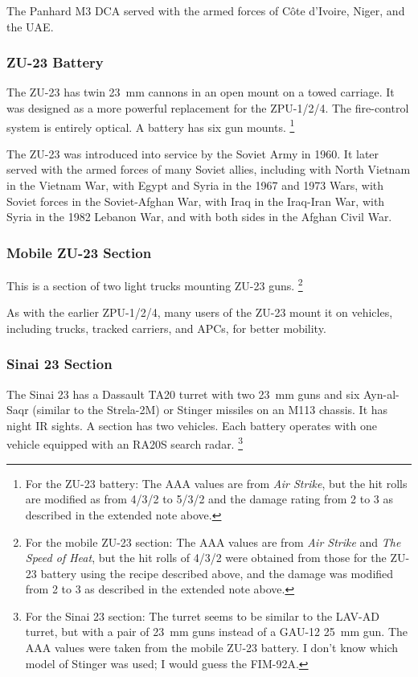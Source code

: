 \documentclass[10pt]{article}
\newcommand{\note}[1]{%
    \footnote{%
        \setlength{\parindent}{0pt}%
        \setlength{\parskip}{\smallskipamount}%
        #1
    }%
}
\begin{document}
The Panhard M3 DCA served with the armed forces of Côte d'Ivoire, Niger, and the UAE.

\subsubsection{ZU-23 Battery}

The ZU-23 has twin 23~mm cannons in an open mount on a towed carriage. It was designed as a more powerful replacement for the ZPU-1/2/4. The fire-control system is entirely optical. A battery has six gun mounts.%
\note{
    For the ZU-23 battery: The AAA values are from \emph{Air Strike}, but the hit rolls are modified as from 4/3/2 to 5/3/2 and the damage rating from 2 to 3 as described in the extended note above.
}

The ZU-23 was introduced into service by the Soviet Army in 1960. It later served with the armed forces of many Soviet allies, including with North Vietnam in the Vietnam War, with Egypt and Syria in the 1967 and 1973 Wars, with Soviet forces in the Soviet-Afghan War, with Iraq in the Iraq-Iran War, with Syria in the 1982 Lebanon War, and with both sides in the Afghan Civil War.

\subsubsection{Mobile ZU-23 Section}

This is a section of two light trucks mounting ZU-23 guns.%
\note{
    For the mobile ZU-23 section: The AAA values are from \emph{Air Strike} and \emph{The Speed of Heat}, but the hit rolls of 4/3/2 were obtained from those for the ZU-23 battery using the recipe described above, and the damage was modified from 2 to 3 as described in the extended note above.
}

As with the earlier ZPU-1/2/4, many users of the ZU-23 mount it on vehicles, including trucks, tracked carriers, and APCs, for better mobility.

\subsubsection{Sinai 23 Section}

The Sinai 23 has a Dassault TA20 turret with two 23~mm guns and six Ayn-al-Saqr (similar to the Strela-2M) or Stinger missiles on an M113 chassis. It has night IR sights. A section has two vehicles. Each battery operates with one vehicle equipped with an RA20S search radar.%
\note{
    For the Sinai 23 section: The turret seems to be similar to the LAV-AD turret, but with a pair of 23~mm guns instead of a GAU-12 25~mm gun. The AAA values were taken from the mobile ZU-23 battery. I don't know which model of Stinger was used; I would guess the FIM-92A.
}
\end{document}

